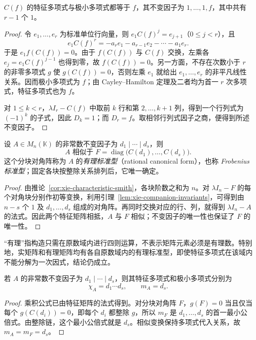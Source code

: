 \begin{lemma}
\label{lem:xie-companion-invariants}
$C(f)$ 的特征多项式与极小多项式都等于 $f$，其不变因子为 $1,\ldots,1,f$，其中共有 $r-1$ 个 $1$。
\end{lemma}
\begin{proof}
令 $e_1,\ldots,e_r$ 为标准单位行向量，则 $e_1C(f)^j=e_{j+1}$（$0\le j<r$），且
\[
    e_1C(f)^r=-a_re_1-a_{r-1}e_2-\cdots-a_1e_r.
\]
于是 $e_1f(C(f))=0$。由于 $f(C(f))$ 与 $C(f)$ 交换，左乘各 $e_j=e_1C(f)^{j-1}$ 也得到零，故 $f(C(f))=0$。另一方面，不存在次数小于 $r$ 的非零多项式 $g$ 使 $g(C(f))=0$，否则左乘 $e_1$ 就给出 $e_1,\ldots,e_r$ 的非平凡线性关系。因而极小多项式为 $f$；由 Cayley--Hamilton 定理及二者均为首一 $r$ 次多项式，特征多项式也为 $f$。

对 $1\le k<r$，$\lambda I_r-C(f)$ 中取前 $k$ 行和第 $2,\ldots,k+1$ 列，得到一个行列式为 $(-1)^k$ 的子式，因此 $D_k=1$；而 $D_r=f$。取相邻行列式因子之商，便得到所述不变因子。
\end{proof}

\begin{theorem}
\label{thm:xie-rational-canonical}
设 $A\in M_n(\mathbb K)$ 的非常数不变因子为 $d_1\mid\cdots\mid d_s$，则
\begin{equation}
\label{eq:xie-rational-canonical}
    A\text{ 相似于 }F=\operatorname{diag}\bigl(C(d_1),\ldots,C(d_s)\bigr).
\end{equation}
这个分块对角阵称为 $A$ 的\emph{有理标准型}（rational canonical form），也称 \emph{Frobenius 标准型}；固定各块按整除关系排列后，它唯一确定。
\end{theorem}
\begin{proof}
由推论~\ref{cor:xie-characteristic-smith}，各块阶数之和为 $n$。对 $\lambda I_n-F$ 的每个对角块分别作初等变换，利用引理~\ref{lem:xie-companion-invariants}，可得到由 $n-s$ 个 $1$ 及 $d_1,\ldots,d_s$ 组成的对角阵。再同时交换对应的行、列，就得到 $\lambda I_n-A$ 的法式。因此两个特征矩阵相抵，$A$ 与 $F$ 相似；不变因子的唯一性也保证了 $F$ 的唯一性。
\end{proof}

“有理”指构造只需在原数域内进行四则运算，不表示矩阵元素必须是有理数。特别地，实矩阵和有理矩阵均有各自原数域内的有理标准型，即使特征多项式在该域内不能分解为一次因式，结论仍成立。

\begin{theorem}
\label{thm:xie-minimal-largest-invariant}
若 $A$ 的非常数不变因子为 $d_1\mid\cdots\mid d_s$，则其特征多项式和极小多项式分别为
\begin{equation}
\label{eq:xie-characteristic-minimal-invariants}
    \chi_A=d_1\cdots d_s,\qquad m_A=d_s.
\end{equation}
\end{theorem}
\begin{proof}
乘积公式已由特征矩阵的法式得到。对分块对角阵 $F$，$g(F)=0$ 当且仅当每个 $g(C(d_i))=0$，即每个 $d_i$ 都整除 $g$，所以 $m_F$ 是 $d_1,\ldots,d_s$ 的首一最小公倍式。由整除链，这个最小公倍式就是 $d_s$。相似变换保持多项式代入关系，故 $m_A=m_F=d_s$。
\end{proof}

